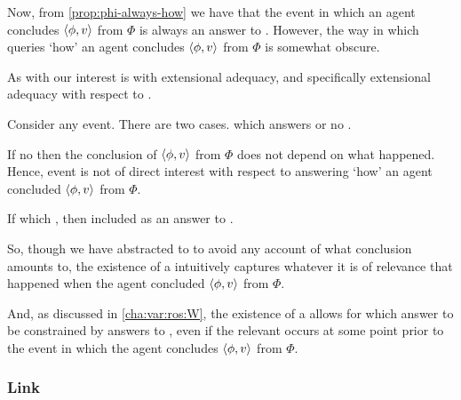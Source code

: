 \begin{note}
  Now, from \autoref{prop:phi-always-how} we have that the event in which an agent concludes \(\langle \phi, v \rangle\) from \(\Phi\) is always an answer to \qHowV{}.
  However, the way in which \qHowV{} queries `how' an agent concludes \(\langle \phi, v \rangle\) from \(\Phi\) is somewhat obscure.

  As with \qWhyV{} our interest is with extensional adequacy, and specifically extensional adequacy with respect to .

  Consider any event.
  There are two cases.
  \ros{} which answers \qWhyV{} or no \ros{}.

  If no \ros{} then the \agents{} conclusion of \(\langle \phi, v \rangle\) from \(\Phi\) does not depend on what happened.
  Hence, event is not of direct interest with respect to answering `how' an agent concluded \(\langle \phi, v \rangle\) from \(\Phi\).

  If \ros{} which \qWhyV{}, then included as an answer to \qHowV{}.

  So, though we have abstracted to  to avoid any account of what conclusion amounts to, the existence of a  intuitively captures whatever it is of relevance that happened when the agent concluded \(\langle \phi, v \rangle\) from \(\Phi\).

  And, as discussed in \autoref{cha:var:ros:W}, the existence of a  allows for \ros{} which answer \qWhyV{} to be constrained by answers to \qHowV{}, even if the relevant  occurs at some point prior to the event in which the agent concludes \(\langle \phi, v \rangle\) from \(\Phi\).
\end{note}

\subsubsection{Link}
\label{cha:var:sec:vars:qhowv:sec:link}

